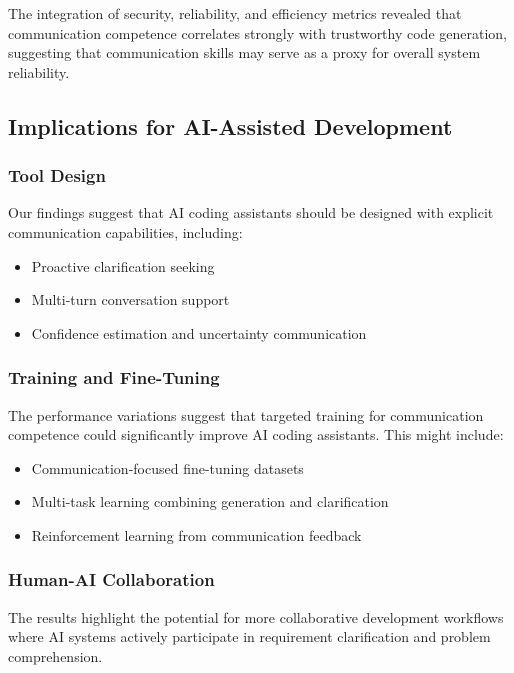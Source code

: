 \documentclass[conference]{IEEEtran}
\begin{document}
The integration of security, reliability, and efficiency metrics revealed that communication competence correlates strongly with trustworthy code generation, suggesting that communication skills may serve as a proxy for overall system reliability.

\subsection{Implications for AI-Assisted Development}

\subsubsection{Tool Design}

Our findings suggest that AI coding assistants should be designed with explicit communication capabilities, including:

\begin{itemize}
    \item Proactive clarification seeking
    \item Multi-turn conversation support
    \item Confidence estimation and uncertainty communication
\end{itemize}

\subsubsection{Training and Fine-Tuning}

The performance variations suggest that targeted training for communication competence could significantly improve AI coding assistants. This might include:

\begin{itemize}
    \item Communication-focused fine-tuning datasets
    \item Multi-task learning combining generation and clarification
    \item Reinforcement learning from communication feedback
\end{itemize}

\subsubsection{Human-AI Collaboration}

The results highlight the potential for more collaborative development workflows where AI systems actively participate in requirement clarification and problem comprehension.
\end{document}
